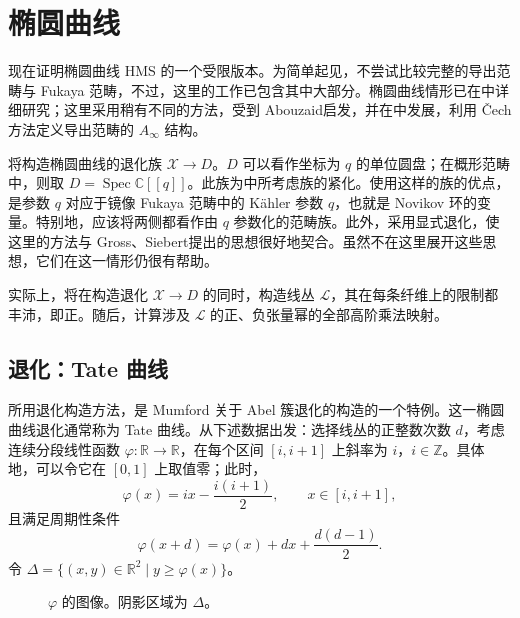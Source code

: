 \section{椭圆曲线}\label{sec:8.4}
\setcounter{equation}{11}
\setcounter{figure}{23}

现在证明椭圆曲线 HMS 的一个受限版本。为简单起见，不尝试比较完整的导出范畴与 Fukaya 范畴，不过，这里的工作已包含其中大部分。椭圆曲线情形已在中详细研究；这里采用稍有不同的方法，受到 Abouzaid启发，并在中发展，利用 Čech 方法定义导出范畴的 $A_\infty$ 结构。

将构造椭圆曲线的退化族 $\mathcal X\to D$。$D$ 可以看作坐标为 $q$ 的单位圆盘；在概形范畴中，则取 $D=\operatorname{Spec}\mathbb C[[q]]$。此族为中所考虑族的紧化。使用这样的族的优点，是参数 $q$ 对应于镜像 Fukaya 范畴中的 Kähler 参数 $q$，也就是 Novikov 环的变量。特别地，应该将两侧都看作由 $q$ 参数化的范畴族。此外，采用显式退化，使这里的方法与 Gross、Siebert提出的思想很好地契合。虽然不在这里展开这些思想，它们在这一情形仍很有帮助。

实际上，将在构造退化 $\mathcal X\to D$ 的同时，构造线丛 $\mathcal L$，其在每条纤维上的限制都丰沛，即正。随后，计算涉及 $\mathcal L$ 的正、负张量幂的全部高阶乘法映射。

\subsection{退化：Tate 曲线}\label{sec:8.4.1}

所用退化构造方法，是 Mumford 关于 Abel 簇退化的构造的一个特例。这一椭圆曲线退化通常称为 Tate 曲线。从下述数据出发：选择线丛的正整数次数 $d$，考虑连续分段线性函数 $\varphi\colon\mathbb R\to\mathbb R$，在每个区间 $[i,i+1]$ 上斜率为 $i$，$i\in\mathbb Z$。具体地，可以令它在 $[0,1]$ 上取值零；此时，
\[
\varphi(x)=ix-\frac{i(i+1)}2,\qquad x\in[i,i+1],
\]
且满足周期性条件
\begin{equation}\label{eq:8.12}
\varphi(x+d)=\varphi(x)+dx+\frac{d(d-1)}2.
\end{equation}
令 $\Delta=\{(x,y)\in\mathbb R^2\mid y\geq\varphi(x)\}$。
\begin{figure}[H]
\centering
{}
\caption{$\varphi$ 的图像。阴影区域为 $\Delta$。}\label{fig:8.24}
\end{figure}

